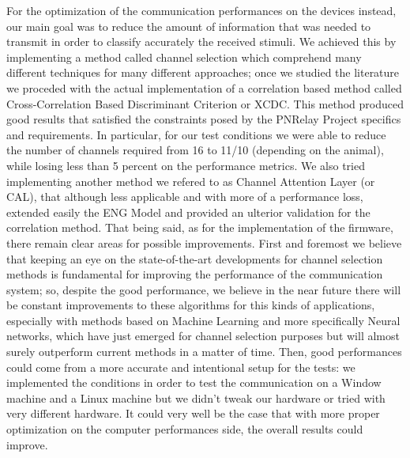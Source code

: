 \documentclass{Configuration_Files/PoliMi3i_thesis}
\begin{document}
For the optimization of the communication performances on the devices instead, our main goal was to reduce the amount of information that was needed to transmit in order to classify accurately the received stimuli.
We achieved this by implementing a method called channel selection which comprehend many different techniques for many different approaches; once we studied the literature we proceded with the actual implementation of a correlation based method called Cross-Correlation Based Discriminant Criterion or XCDC.
This method produced good results that satisfied the constraints posed by the PNRelay Project specifics and requirements.
In particular, for our test conditions we were able to reduce the number of channels required from 16 to 11/10 (depending on the animal), while losing less than 5 percent on the performance metrics.
We also tried implementing another method we refered to as Channel Attention Layer (or CAL), that although less applicable and with more of a performance loss, extended easily the ENG Model and provided an ulterior validation for the correlation method.
That being said, as for the implementation of the firmware, there remain clear areas for possible improvements.
First and foremost we believe that keeping an eye on the state-of-the-art developments for channel selection methods is fundamental for improving the performance of the communication system; so, despite the good performance, we believe in the near future there will be constant improvements to these algorithms for this kinds of applications, especially with methods based on Machine Learning and more specifically Neural networks, which have just emerged for channel selection purposes but will almost surely outperform current methods in a matter of time.
Then, good performances could come from a more accurate and intentional setup for the tests: we implemented the conditions in order to test the communication on a Window machine and a Linux machine but we didn't tweak our hardware or tried with very different hardware.
It could very well be the case that with more proper optimization on the computer performances side, the overall results could improve.

\printbibliography %


\cleardoublepage
{} %


\listoffigures


\cleardoublepage
\end{document}

